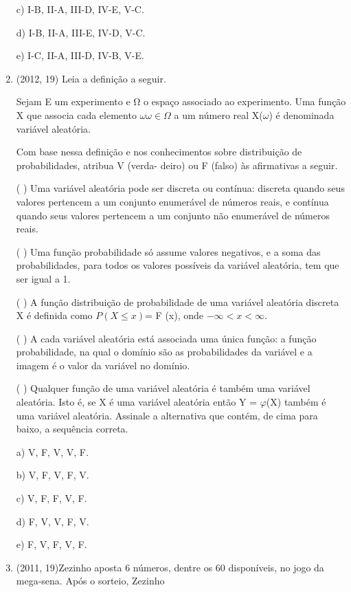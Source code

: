 \documentclass{article}
\begin{document}
\begin{enumerate}
c) I-B, II-A, III-D, IV-E, V-C.

d) I-B, II-A, III-E, IV-D, V-C.

e) I-C, II-A, III-D, IV-B, V-E.\newline





\item(2012, 19) Leia a definição a seguir.

Sejam E um experimento e Ω o espaço associado ao experimento. Uma função X que associa cada
elemento $ω\omega \in \Omega$ a um número real X($\omega$) é denominada variável aleatória.

Com base nessa definição e nos conhecimentos sobre distribuição de probabilidades, atribua V (verda-
deiro) ou F (falso) às afirmativas a seguir.

( ) Uma variável aleatória pode ser discreta ou contínua: discreta quando seus valores pertencem a um
conjunto enumerável de números reais, e contínua quando seus valores pertencem a um conjunto
não enumerável de números reais.

( ) Uma função probabilidade só assume valores negativos, e a soma das probabilidades, para todos os
valores possíveis da variável aleatória, tem que ser igual a 1.

( ) A função distribuição de probabilidade de uma variável aleatória discreta X é definida como
$P (X \leq x) $= F (x), onde $-\infty < x < \infty.$

( ) A cada variável aleatória está associada uma única função: a função probabilidade, na qual o domínio
são as probabilidades da variável e a imagem é o valor da variável no domínio.

( ) Qualquer função de uma variável aleatória é também uma variável aleatória. Isto é, se X é uma
variável aleatória então Y = $\varphi$(X) também é uma variável aleatória.
Assinale a alternativa que contém, de cima para baixo, a sequência correta.

a) V, F, V, V, F.

b) V, F, V, F, V.

c) V, F, F, V, F.

d) F, V, V, F, V.

e) F, V, F, V, F.\newline










\item(2011, 19)Zezinho aposta 6 números, dentre os 60 disponíveis, no jogo da mega-sena. Após o sorteio, Zezinho


\end{enumerate}
\end{document}
